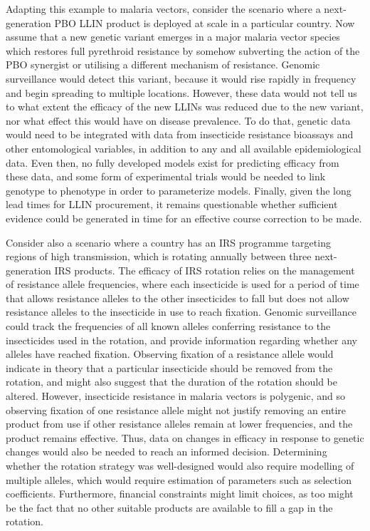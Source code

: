 \documentclass[a4paper,11pt,abstracton,hidelinks]{scrartcl}
\begin{document}
Adapting this example to malaria vectors, consider the scenario where a next-generation PBO LLIN product is deployed at scale in a particular country.
%
Now assume that a new genetic variant emerges in a major malaria vector species which restores full pyrethroid resistance by somehow subverting the action of the PBO synergist or utilising a different mechanism of resistance.
%
Genomic surveillance would detect this variant, because it would rise rapidly in frequency and begin spreading to multiple locations.
%
However, these data would not tell us to what extent the efficacy of the new LLINs was reduced due to the new variant, nor what effect this would have on disease prevalence.
%
To do that, genetic data would need to be integrated with data from insecticide resistance bioassays and other entomological variables, in addition to any and all available epidemiological data.
%
Even then, no fully developed models exist for predicting efficacy from these data, and some form of experimental trials would be needed to link genotype to phenotype in order to parameterize models.
%
Finally, given the long lead times for LLIN procurement, it remains questionable whether sufficient evidence could be generated in time for an effective course correction to be made.


Consider also a scenario where a country has an IRS programme targeting regions of high transmission, which is rotating annually between three next-generation IRS products.
%
The efficacy of IRS rotation relies on the management of resistance allele frequencies, where each insecticide is used for a period of time that allows resistance alleles to the other insecticides to fall but does not allow resistance alleles to the insecticide in use to reach fixation.
%
Genomic surveillance could track the frequencies of all known alleles conferring resistance to the insecticides used in the rotation, and provide information regarding whether any alleles have reached fixation.
%
Observing fixation of a resistance allele would indicate in theory that a particular insecticide should be removed from the rotation, and might also suggest that the duration of the rotation should be altered.
%
However, insecticide resistance in malaria vectors is polygenic, and so observing fixation of one resistance allele might not justify removing an entire product from use if other resistance alleles remain at lower frequencies, and the product remains effective.
%
Thus, data on changes in efficacy in response to genetic changes would also be needed to reach an informed decision.
%
Determining whether the rotation strategy was well-designed would also require modelling of multiple alleles, which would require estimation of parameters such as selection coefficients.
%
Furthermore, financial constraints might limit choices, as too might be the fact that no other suitable products are available to fill a gap in the rotation.
\end{document}
